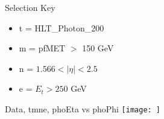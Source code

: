 \documentclass{beamer}
\author{Reese Petersen}
\institute[]{University of Minnesota \\
\medskip
\texttt{pet00831@umn.edu} %
}
\date{\today} %
\title[UMN-CMS Group Meeting]{}
\begin{document}
\begin{frame}{Selection Key}
    \begin{itemize}
        \item t = HLT\_Photon\_200
        \item m = pfMET \(>\) 150 GeV
        \item n = \(1.566<|\eta|<2.5\)
        \item e = \(E_t>250\) GeV
    \end{itemize}{}
\end{frame}
\begin{frame}{Data, tmne, phoEta vs phoPhi}
    \texttt{[image: ]}
\end{frame}
\end{document}
